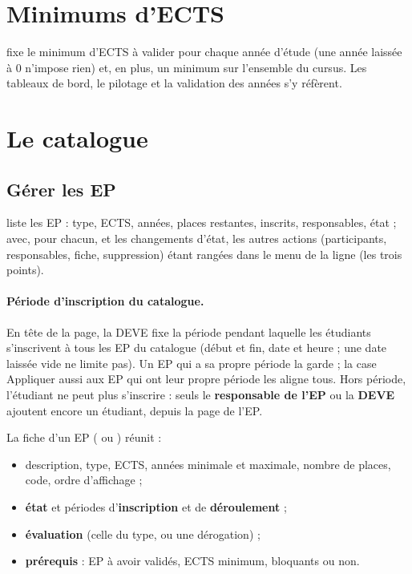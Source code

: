 \documentclass[11pt,a4paper]{article}
\begin{document}
\section{Minimums d'ECTS}\label{sec:minimums}

 fixe le minimum d'ECTS à valider pour chaque année
d'étude (une année laissée à 0 n'impose rien) et, en plus, un minimum sur l'ensemble du
cursus. Les tableaux de bord, le pilotage et la validation des années s'y réfèrent.


\section{Le catalogue}\label{sec:catalogue}

\subsection{Gérer les EP}

 liste les EP : type, ECTS, années, places
restantes, inscrits, responsables, état ; avec, pour chacun,  et les
changements d'état, les autres actions (participants, responsables, fiche, suppression) étant
rangées dans le menu de la ligne (les trois points).


\paragraph{Période d'inscription du catalogue.} En tête de la page, la DEVE fixe la période
pendant laquelle les étudiants s'inscrivent à tous les EP du catalogue (début et fin, date et
heure ; une date laissée vide ne limite pas). Un EP qui a sa propre période la garde ; la case
\og Appliquer aussi aux EP qui ont leur propre période\fg{} les aligne tous. Hors période,
l'étudiant ne peut plus s'inscrire : seuls le \textbf{responsable de l'EP} ou la \textbf{DEVE}
ajoutent encore un étudiant, depuis la page  de l'EP.

La fiche d'un EP ( ou ) réunit :
\begin{itemize}
  \item description, type, ECTS, années minimale et maximale, nombre de places, code, ordre
    d'affichage ;
  \item \textbf{état} et périodes d'\textbf{inscription} et de \textbf{déroulement} ;
  \item \textbf{évaluation} (celle du type, ou une dérogation) ;
  \item \textbf{prérequis} : EP à avoir validés, ECTS minimum, bloquants ou non.
\end{itemize}
\end{document}
